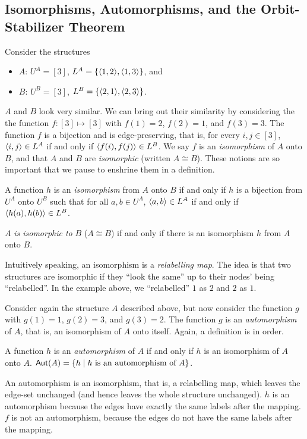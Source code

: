 \subsection{Isomorphisms, Automorphisms, and the Orbit-Stabilizer Theorem}
Consider the structures
\begin{itemize}
\item $A$: $U^A=[3]$, $L^A=\{\mbox{$\langle 1,2 \rangle$},\mbox{$\langle 1,3 \rangle$}\}$, and
\item $B$: $U^B=[3]$, $L^B=\{\mbox{$\langle 2,1 \rangle$},\mbox{$\langle 2,3 \rangle$}\}$.
\end{itemize}
$A$ and $B$ look very similar. We can bring out their similarity by considering the the function $f:[3]\mapsto[3]$ with $f(1)=2$, $f(2)=1$, and $f(3)=3$. The function $f$ is a bijection and is edge-preserving, that is, for every $i,j\in[3]$, $\mbox{$\langle i,j \rangle$}\in L^A$ if and only if $\mbox{$\langle f(i),f(j) \rangle$}\in L^B$. We say $f$ is an \emph{isomorphism} of $A$ onto $B$, and that $A$ and $B$ are \emph{isomorphic} (written $A\cong B$). These notions are so important that we pause to enshrine them in a definition.
\begin{definition}\label{iso-def}
A function $h$ is an \emph{isomorphism} from $A$ onto $B$ if and only if $h$ is a bijection from $U^A$ onto $U^B$ such that for all $a,b\in U^A$, $\mbox{$\langle a,b \rangle$}\in L^A$ if and only if $\mbox{$\langle h(a),h(b) \rangle$}\in L^B$.

$A$ \emph{is isomorphic to} $B$ ($A\cong B$) if and only if there is an isomorphism $h$ from $A$ onto $B$.
\end{definition}
\begin{aside}
    Intuitively speaking, an isomorphism is a \emph{relabelling map}. The idea is that two structures are isomorphic if they ``look the same'' up to their nodes' %
    being ``relabelled''. In the example above, we ``relabelled'' $1$ as $2$ and $2$ as $1$. 
\end{aside}

Consider again the structure $A$ described above, but now consider the function $g$ with $g(1)=1$, $g(2)=3$, and $g(3)=2$. The function $g$ is an \emph{automorphism} of $A$, that is, an isomorphism of $A$ onto itself. Again, a definition is in order.
\begin{definition}
A function $h$ is an \emph{automorphism} of $A$  if and only if $h$ is an isomorphism of $A$ onto $A$. $\mbox{$\mathsf{Aut}(A)$}=\{h\mid h\mbox{ is an automorphism of }A\}$.
\end{definition}

\begin{aside}
    An automorphism is an isomorphism, that is, a relabelling map, which leaves the edge-set unchanged (and hence leaves the whole structure unchanged). $h$ is an automorphism because the edges have exactly the same labels after the mapping. $f$ is not an automorphism, because the edges do not have the same labels after the mapping. 
\end{aside}

